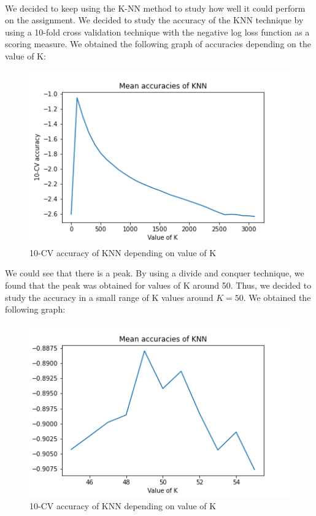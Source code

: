 \documentclass[a4paper, 11pt, oneside]{article}
\begin{document}
\paragraph{}We decided to keep using the K-NN method to study how well it could perform on the assignment. We decided to study the accuracy of the KNN technique by using a 10-fold cross validation technique with the negative log loss function as a scoring measure. We obtained the following graph of accuracies depending on the value of K:
\begin{figure}[H]
\center
\includegraphics[scale=0.3]{knn/log_loss.png}
\caption{10-CV accuracy of KNN depending on value of K}
\end{figure}
We could see that there is a peak. By using a divide and conquer technique, we found that the peak was obtained for values of K around 50. Thus, we decided to study the accuracy in a small range of K values around $K=50$. We obtained the following graph:
\begin{figure}[H]
\center
\includegraphics[scale=0.4]{knn/log_loss_focused.png}
\caption{10-CV accuracy of KNN depending on value of K}
\label{fig:knn_log_loss_focused}
\end{figure}
\end{document}
